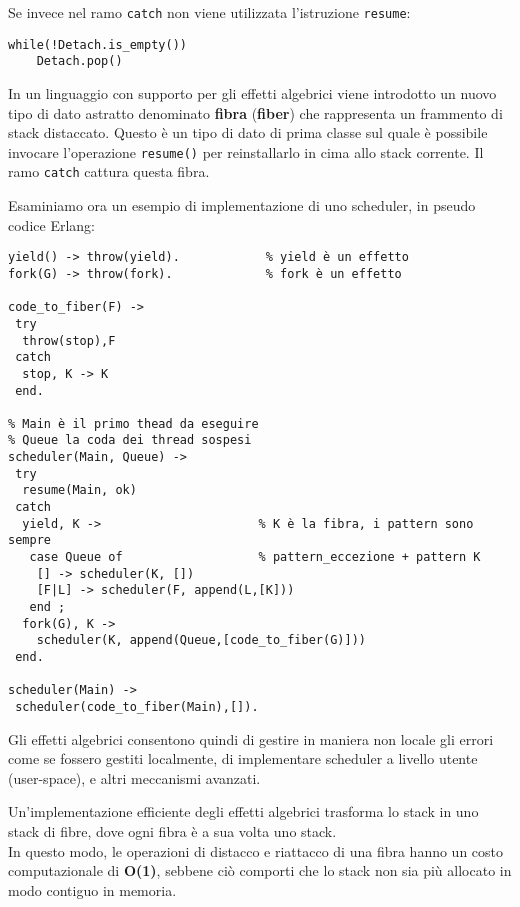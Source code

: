 \documentclass{article}
\begin{document}
Se invece nel ramo \texttt{catch} non viene utilizzata l'istruzione \texttt{resume}:
\begin{tcolorbox}
\begin{verbatim}
while(!Detach.is_empty())
    Detach.pop()
\end{verbatim}
\end{tcolorbox}
\vspace{8pt}
In un linguaggio con supporto per gli effetti algebrici viene introdotto un nuovo tipo di dato astratto denominato \textbf{fibra} (\textbf{fiber}) che rappresenta un frammento di stack distaccato. Questo è un tipo di dato di prima classe sul quale è possibile invocare l'operazione \texttt{resume()} per reinstallarlo in cima allo stack corrente. Il ramo \texttt{catch} cattura questa fibra.

Esaminiamo ora un esempio di implementazione di uno scheduler, in pseudo codice Erlang:
\begin{tcolorbox}
\begin{verbatim}
yield() -> throw(yield).            % yield è un effetto
fork(G) -> throw(fork).             % fork è un effetto

code_to_fiber(F) ->
 try
  throw(stop),F
 catch
  stop, K -> K
 end.

% Main è il primo thead da eseguire
% Queue la coda dei thread sospesi
scheduler(Main, Queue) ->
 try
  resume(Main, ok)
 catch
  yield, K ->                      % K è la fibra, i pattern sono sempre
   case Queue of                   % pattern_eccezione + pattern K
    [] -> scheduler(K, [])
    [F|L] -> scheduler(F, append(L,[K]))
   end ;
  fork(G), K ->
    scheduler(K, append(Queue,[code_to_fiber(G)]))
 end.

scheduler(Main) ->
 scheduler(code_to_fiber(Main),[]).
\end{verbatim}
\end{tcolorbox}
\vspace{8pt}
Gli effetti algebrici consentono quindi di gestire in maniera non locale gli errori come se fossero gestiti localmente, di implementare scheduler a livello utente (user-space), e altri meccanismi avanzati.

Un'implementazione efficiente degli effetti algebrici trasforma lo stack in uno stack di fibre, dove ogni fibra è a sua volta uno stack.\\
In questo modo, le operazioni di distacco e riattacco di una fibra hanno un costo computazionale di \textbf{O(1)}, sebbene ciò comporti che lo stack non sia più allocato in modo contiguo in memoria.
\end{document}
